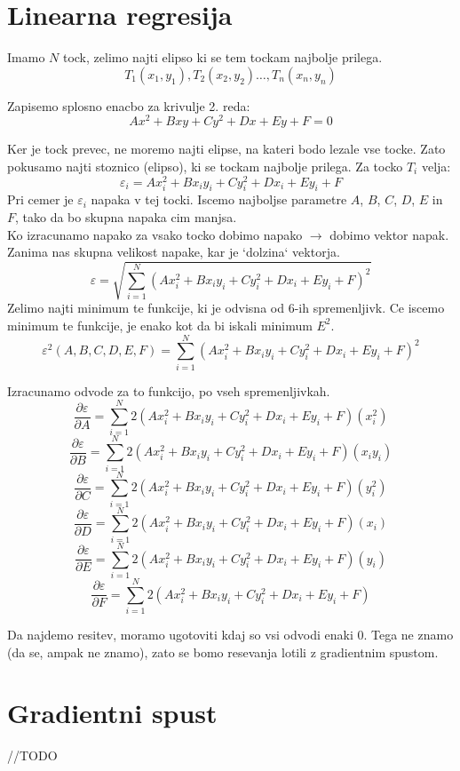 \documentclass[a4paper, 12pt]{article}
\begin{document}
	\section*{Linearna regresija}
	Imamo $N$ tock, zelimo najti elipso ki se tem tockam najbolje prilega.
	$$T_1(x_1, y_1), T_2(x_2, y_2) \ldots, T_n(x_n, y_n)$$

	Zapisemo splosno enacbo za krivulje 2. reda:
	$$Ax^2 + Bxy + Cy^2 + Dx + Ey + F = 0$$

	Ker je tock prevec, ne moremo najti elipse, na kateri bodo lezale vse tocke. Zato pokusamo najti stoznico (elipso), ki se tockam najbolje prilega. Za tocko $T_i$ velja:
	$$\varepsilon_i = Ax_i^2 + Bx_iy_i + Cy_i^2 + Dx_i + Ey_i + F$$
	Pri cemer je $\varepsilon_i$ napaka v tej tocki. Iscemo najboljse parametre $A$, $B$, $C$, $D$, $E$ in $F$, tako da bo skupna napaka cim manjsa.\\
	Ko izracunamo napako za vsako tocko dobimo napako $\rightarrow$ dobimo vektor napak. Zanima nas skupna velikost napake, kar je `dolzina` vektorja.
	$$\varepsilon = \sqrt{\sum_{i=1}^{N} (Ax_i^2 + Bx_iy_i + Cy_i^2 + Dx_i + Ey_i + F)^2}$$
	Zelimo najti minimum te funkcije, ki je odvisna od 6-ih spremenljivk. Ce iscemo minimum te funkcije, je enako kot da bi iskali minimum $E^2$.
	$$\varepsilon^2(A, B, C, D, E, F) = \sum_{i=1}^{N} (Ax_i^2 + Bx_iy_i + Cy_i^2 + Dx_i + Ey_i + F)^2$$
	
	Izracunamo odvode za to funkcijo, po vseh spremenljivkah.
	$$\frac{\partial \varepsilon}{\partial A} = \sum_{i=1}^{N}2(Ax_i^2 + Bx_iy_i + Cy_i^2 + Dx_i + Ey_i + F)(x_i^2)$$
	$$\frac{\partial \varepsilon}{\partial B} = \sum_{i=1}^{N}2(Ax_i^2 + Bx_iy_i + Cy_i^2 + Dx_i + Ey_i + F)(x_iy_i)$$
	$$\frac{\partial \varepsilon}{\partial C} = \sum_{i=1}^{N}2(Ax_i^2 + Bx_iy_i + Cy_i^2 + Dx_i + Ey_i + F)(y_i^2)$$
	$$\frac{\partial \varepsilon}{\partial D} = \sum_{i=1}^{N}2(Ax_i^2 + Bx_iy_i + Cy_i^2 + Dx_i + Ey_i + F)(x_i)$$
	$$\frac{\partial \varepsilon}{\partial E} = \sum_{i=1}^{N}2(Ax_i^2 + Bx_iy_i + Cy_i^2 + Dx_i + Ey_i + F)(y_i)$$
	$$\frac{\partial \varepsilon}{\partial F} = \sum_{i=1}^{N}2(Ax_i^2 + Bx_iy_i + Cy_i^2 + Dx_i + Ey_i + F)$$


	Da najdemo resitev, moramo ugotoviti kdaj so vsi odvodi enaki 0. Tega ne znamo (da se, ampak ne znamo), zato se bomo resevanja lotili z gradientnim spustom.

	\section*{Gradientni spust}
	//TODO\\
	
\end{document}
